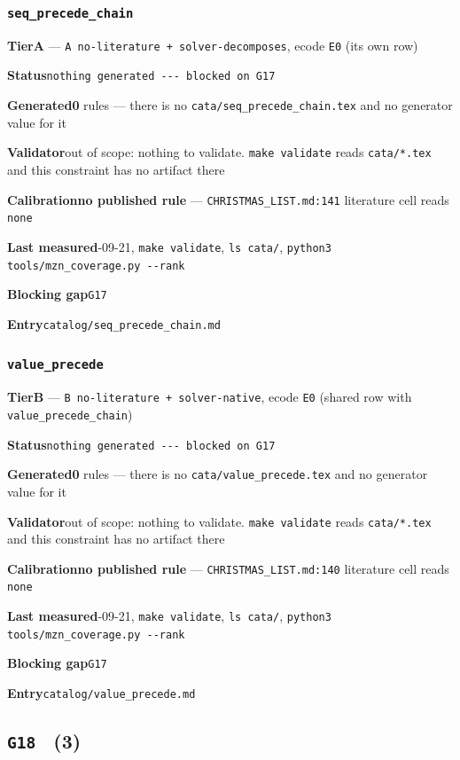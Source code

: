 \documentclass[10pt,a4paper]{article}
\newcommand{\entryfield}[2]{{\raggedright\textbf{#1}\quad #2\par}}
\begin{document}
\subsubsection*{\texttt{seq\_\allowbreak{}precede\_\allowbreak{}chain}}
\label{entry:seq-precede-chain}
\entryfield{Tier}{\textbf{A} --- \texttt{A no-\allowbreak{}literature + solver-\allowbreak{}decomposes}, ecode \texttt{E0} (its own row)}
\entryfield{Status}{\texttt{nothing generated -\allowbreak{}-\allowbreak{}-\allowbreak{} blocked on G17}}
\entryfield{Generated}{\textbf{0} rules --- there is no \texttt{cata/\allowbreak{}seq\_\allowbreak{}precede\_\allowbreak{}chain.\allowbreak{}tex} and no generator value for it}
\entryfield{Validator}{out of scope: nothing to validate. \texttt{make validate} reads \texttt{cata/*.tex} and this constraint has no artifact there}
\entryfield{Calibration}{\textbf{no published rule} --- \texttt{CHRISTMAS\_LIST.md:141} literature cell reads \texttt{none}}
\entryfield{Last measured}{2026-09-21, \texttt{make validate}, \texttt{ls cata/}, \texttt{python3 tools/\allowbreak{}mzn\_\allowbreak{}coverage.\allowbreak{}py -\allowbreak{}-\allowbreak{}rank}}
\entryfield{Blocking gap}{\texttt{G17}}
\entryfield{Entry}{\texttt{catalog/seq\_precede\_chain.md}}
\subsubsection*{\texttt{value\_\allowbreak{}precede}}
\label{entry:value-precede}
\entryfield{Tier}{\textbf{B} --- \texttt{B no-\allowbreak{}literature + solver-\allowbreak{}native}, ecode \texttt{E0} (shared row with \texttt{value\_precede\_chain})}
\entryfield{Status}{\texttt{nothing generated -\allowbreak{}-\allowbreak{}-\allowbreak{} blocked on G17}}
\entryfield{Generated}{\textbf{0} rules --- there is no \texttt{cata/value\_precede.tex} and no generator value for it}
\entryfield{Validator}{out of scope: nothing to validate. \texttt{make validate} reads \texttt{cata/*.tex} and this constraint has no artifact there}
\entryfield{Calibration}{\textbf{no published rule} --- \texttt{CHRISTMAS\_LIST.md:140} literature cell reads \texttt{none}}
\entryfield{Last measured}{2026-09-21, \texttt{make validate}, \texttt{ls cata/}, \texttt{python3 tools/\allowbreak{}mzn\_\allowbreak{}coverage.\allowbreak{}py -\allowbreak{}-\allowbreak{}rank}}
\entryfield{Blocking gap}{\texttt{G17}}
\entryfield{Entry}{\texttt{catalog/value\_precede.md}}
\subsection*{\texttt{G18} \ \normalsize(3)}
\end{document}
